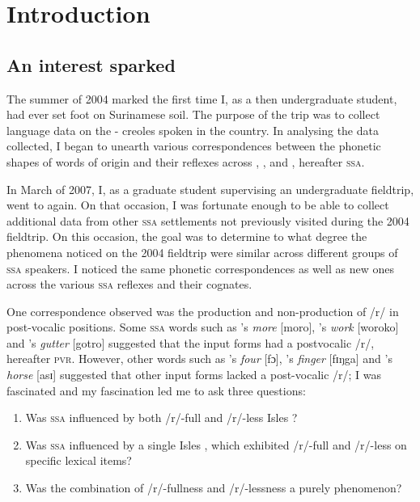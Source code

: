 \chapter{Introduction}\label{ch:1}

\section{An interest sparked} \label{1.1}
The summer of 2004 marked the first time I, as a then undergraduate student, had ever set foot on Surinamese soil. The purpose of the trip was to collect language data on the - creoles spoken in the country. In analysing the data collected, I began to unearth various correspondences between the phonetic shapes of words of  origin and their reflexes across , , and , hereafter \textsc{ssa}.

In March of 2007, I, as a graduate student supervising an undergraduate fieldtrip, went to  again. On that occasion, I was fortunate enough to be able to collect additional data from other \textsc{ssa}  settlements not previously visited during the 2004 fieldtrip. On this occasion, the goal was to determine to what degree the phenomena noticed on the 2004 fieldtrip were similar across different groups of \textsc{ssa}  speakers. I noticed the same phonetic correspondences as well as new ones across the various \textsc{ssa}  reflexes and their  cognates.

One correspondence observed was the production and non-production of /r/ in post-vocalic positions. Some \textsc{ssa}  words such as 's \emph{more} [moro], 's \emph{work} [woroko] and 's  \emph{gutter} [gotro] suggested that the  input forms had a postvocalic /r/, hereafter \textsc{pvr}. However, other words such as 's \emph{four} [fɔ], 's \emph{finger} [fɪŋga] and 's \emph{horse} [asɪ] suggested that other  input forms lacked a post-vocalic /r/; I was fascinated and my fascination led me to ask three questions:

\begin{enumerate}
\item Was \textsc{ssa}  influenced by both /r/-full and /r/-less  Isles  ?
\item Was \textsc{ssa}  influenced by a single  Isles  , which exhibited /r/-full and /r/-less on specific lexical items?
\item Was the combination of /r/-fullness and /r/-lessness a purely  phenomenon?
\end{enumerate}


